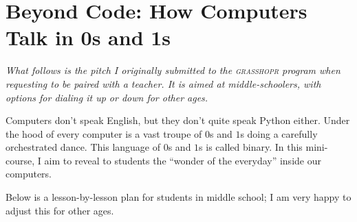 \section{Beyond Code: How Computers Talk in 0s and 1s}
\label{appendix:pitch}

\emph{What follows is the pitch I originally submitted to the \textsc{grasshopr} program when requesting to be paired with a teacher.
It is aimed at middle-schoolers, with options for dialing it up or down for other ages.}

Computers don't speak English, but they don't quite speak Python either.
Under the hood of every computer is a vast troupe of $0$s and $1$s doing a carefully orchestrated dance.
This language of $0$s and $1$s is called binary.
In this mini-course, I aim to reveal to students the ``wonder of the everyday'' inside our computers.

Below is a lesson-by-lesson plan for students in middle school; I am very happy to adjust this for other ages.

